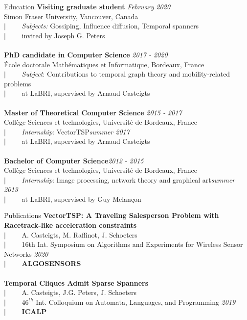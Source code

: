 \documentclass[french]{resume} %
\begin{document}
\begin{rSection}{Education}
{\bf Visiting graduate student} \hfill {\em February 2020}
\\ Simon Fraser University, Vancouver, Canada
\\ $| \qquad$ \textit{Subjects:} Gossiping, Influence diffusion, Temporal spanners
\\ $| \qquad$ invited by Joseph G. Peters
\\
\\{\bf PhD candidate in Computer Science} \hfill {\em 2017 - 2020} 
\\ École doctorale Mathématiques et Informatique, Bordeaux, France
\\ $| \qquad$ \textit{Subject}: Contributions to temporal graph theory and mobility-related problems
\\ $| \qquad$ at LaBRI, supervised by Arnaud Casteigts
\\
\\{\bf Master of Theoretical Computer Science} \hfill {\em 2015 -  2017} 
\\ Collège Sciences et technologies, Université de Bordeaux, France 
\\ $| \qquad$ \textit{Internship}: VectorTSP\hfill {\em summer 2017} 
\\ $| \qquad $ at LaBRI, supervised by Arnaud Casteigts
\\
\\ \textbf{Bachelor of Computer Science}\hfill {\em 2012 -  2015} 
\\ Collège Sciences et technologies, Université de Bordeaux, France 
\\ $| \qquad$ \textit{Internship}: Image processing, network theory and graphical art\hfill {\em summer 2013} 
\\ $|  \qquad $ at LaBRI, supervised by Guy Melançon
\end{rSection}

\begin{rSection}{Publications }
{\bf VectorTSP: A Traveling Salesperson Problem with Racetrack-like acceleration constraints}\\
$| \qquad$ A. Casteigts, M. Raffinot, J. Schoeters\\
$| \qquad$ 16th Int. Symposium on Algorithms and Experiments for Wireless Sensor Networks \hfill {\em 2020}\\
$| \qquad$ \textbf{ALGOSENSORS} 
\\ \\
{\bf Temporal Cliques Admit Sparse Spanners}\\
$| \qquad$ A. Casteigts, J.G. Peters, J. Schoeters\\
$| \qquad$ $46^{th}$ Int. Colloquium on Automata, Languages, and Programming \hfill {\em 2019}\\
$| \qquad$ \textbf{ICALP}
\end{rSection}
\end{document}
